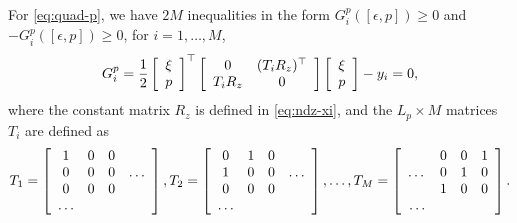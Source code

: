 \documentclass[11pt, onecolumn]{article}
\theoremstyle{plain}
\theoremstyle{plain}
\theoremstyle{definition}
\begin{document}
For \eqref{eq:quad-p}, we have $2M$ inequalities in the form $G_i^p([\epsilon,p]) \ge 0$ and
$-G_i^p([\epsilon,p]) \ge 0$, for $i=1,\dots, M$,
\begin{align*}
  G_i^p = {1\over 2}\left[ \begin{array}[c]{c} \xi\\ p \end{array} \right]^\top
  \left[ \begin{array}[c]{cc} 0 & (T_i R_z)^\top \\ T_i R_z & 0  \end{array} \right]
  \left[ \begin{array}[c]{c} \xi \\p \end{array} \right] - y_i = 0,
\end{align*}
where the constant matrix $R_z$ is defined in \eqref{eq:ndz-xi}, and the $L_p\times M$ matrices
$T_i$ are defined as
\begin{align}
  \label{eq:def-Ti}
  T_1 = \left[ \begin{array}[c]{cccc} 1 & 0 & 0 & \\ 0&0&0&\dots \\ 0&0&0& \\ \dots \end{array} \right],
  T_2 = \left[ \begin{array}[c]{cccc} 0 & 1 & 0 & \\ 1&0&0&\dots \\ 0&0&0& \\ \dots\end{array} \right],
  \dots,
  T_M = \left[ \begin{array}[c]{cccc} &0 & 0 & 1  \\ \dots&0&1&0 \\ &1&0&0 \\ \dots\end{array} \right].
\end{align}
\end{document}
